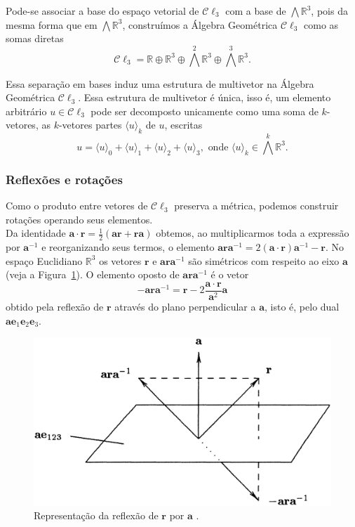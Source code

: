 \documentclass[a4paper,12pt]{report}
\theoremstyle{plain}
\theoremstyle{definition}
\begin{document}
	Pode-se associar a base do espaço vetorial de $\mathcal C \ell_3$ com a base de $\bigwedge\mathbb{R}^3$, pois da mesma forma que em $\bigwedge\mathbb{R}^3$, construímos a Álgebra Geométrica $\mathcal C \ell_3$ como as somas diretas $$\mathcal C \ell_3 = \mathbb{R} \oplus \mathbb{R}^3\oplus \bigwedge^2\mathbb{R}^3 \oplus \bigwedge^3\mathbb{R}^3.$$
	
	Essa separação em bases induz uma estrutura de multivetor na Álgebra Geométrica $\mathcal C \ell_3$. Essa estrutura de multivetor é única, isso é, um elemento arbitrário $u\in \mathcal C \ell_3$ pode ser decomposto unicamente como uma soma de $k$-vetores, as $k$-vetores partes $\langle u\rangle_k$ de $u$, escritas $$u=\langle u\rangle_0 +\langle u\rangle_1 +\langle u\rangle_2 + \langle u\rangle_3, \text{ onde } \langle u\rangle_k \in \bigwedge^k\mathbb{R}^3.$$
	 
	\subsubsection{Reflexões e rotações}
	Como o produto entre vetores de $\mathcal C \ell_3$ preserva a métrica, podemos construir rotações operando seus elementos. 
	\\
	
	Da identidade $\mathbf a\cdot \mathbf r = \frac 1 2 (\mathbf a\mathbf r + \mathbf r\mathbf a)$ obtemos, ao multiplicarmos toda a expressão por $\mathbf a^{-1}$ e reorganizando seus termos, o elemento $\mathbf a\mathbf r\mathbf a^{-1} = 2(\mathbf a\cdot \mathbf r)\mathbf a^{-1} -\mathbf r$. No espaço Euclidiano $\mathbb{R}^3$ os vetores $\mathbf r$ e $\mathbf a\mathbf r\mathbf a^{-1}$ são simétricos com respeito ao eixo $\mathbf a$ (veja a Figura~\ref{fig:rotacaoCl3}). O elemento oposto de $\mathbf a\mathbf r\mathbf a^{-1}$ é o vetor
	$$-\mathbf a\mathbf r\mathbf a^{-1} = \mathbf r-2\frac{\mathbf a\cdot\mathbf r}{\mathbf a^2}\mathbf a$$ obtido pela reflexão de $\mathbf r$ através do plano perpendicular a $\mathbf a$, isto é, pelo dual $\mathbf a\mathbf e_1\mathbf e_2\mathbf e_3$.
	 
	\begin{figure}[H]
		\begin{center}
			\includegraphics[width=0.6\linewidth]{figures/rotacaoCl3.png}
		\end{center}
		\caption{Representação da reflexão de $\mathbf r$ por $\mathbf a$ \cite{lounestoClifford}.}
		\label{fig:rotacaoCl3}
	\end{figure}
	 
\end{document}
